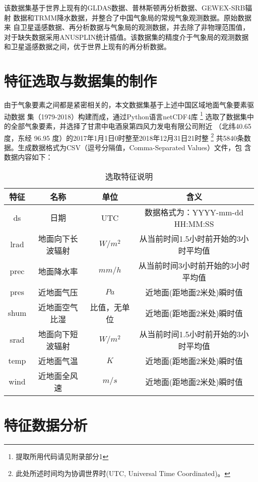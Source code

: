 \documentclass[AutoFakeBold]{LZUThesis}
\begin{document}
该数据集基于世界上现有的GLDAS数据、普林斯顿再分析数据、GEWEX-SRB辐射
数据和TRMM降水数据，并整合了中国气象局的常规气象观测数据。原始数据来
自卫星遥感数据、再分析数据与气象局的观测数据，并去除了非物理范围值，
对于缺失数据采用ANUSPLIN统计插值。该数据集的精度介于气象局的观测数据
和卫星遥感数据之间，优于世界上现有的再分析数据。\cite{6bab74c1-f2dd-4e24-a833-81f33bedf9b1}

\section{特征选取与数据集的制作}
由于气象要素之间都是紧密相关的，本文数据集基于上述中国区域地面气象要素驱动数据
集（1979-2018）构建而成，通过Python语言netCDF4库
\footnote{提取所用代码请见附录部分1}
选取了数据集中的全部气象要素，并选择了甘肃中电酒泉第四风力发电有限公司附近
（北纬40.65 度，东经 96.95 度）的2017年1月1日0时整至2018年12月31日21时整
\footnote{此处所述时间均为协调世界时(UTC, Universal Time Coordinated)。}
共5840条数据。生成数据格式为CSV（逗号分隔值，Comma-Separated Values）文件，包
含数据内容如下：

\begin{table}[H]
    \centering
    \caption{选取特征说明}
    \begin{tabular}{cccc}
    \toprule
    特征 & 名称 & 单位 & 含义 \\
    \midrule
    ds & 日期 & UTC & 数据格式为：YYYY-mm-dd HH:MM:SS \\
    lrad & 地面向下长波辐射 & $W/m^2$ & 从当前时间1.5小时前开始的3小时平均值 \\
    prec & 地面降水率 & $mm/h$ & 从当前时间3小时前开始的3小时平均值 \\
    pres & 近地面气压 & $Pa$ & 近地面(距地面2米处)瞬时值 \\
    shum & 近地面空气比湿 & 比值，无单位 & 近地面(距地面2米处)瞬时值 \\
    srad & 地面向下短波辐射 & $W/m^2$ & 从当前时间1.5小时前开始的3小时平均值 \\
    temp & 近地面气温 & $K$ & 近地面(距地面2米处)瞬时值 \\
    wind & 近地面全风速 & $m/s$ & 近地面(距地面2米处)瞬时值 \\
    \bottomrule
    \end{tabular}
    \label{features}
\end{table}

\section{特征数据分析}
\end{document}

